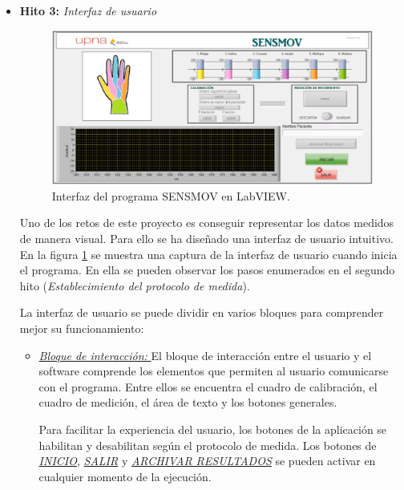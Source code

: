 \begin{itemize} [label=]
	 
	
	\item \textbf{Hito 3:} \textit{Interfaz de usuario}
	
	\begin{figure}[H]
		\centering
		\includegraphics[width=1\textwidth]{./img/interfazSMinicio}
		\caption{Interfaz del programa SENSMOV en LabVIEW.}
		\label{fig:interfazinicio}
	\end{figure}
	 
	Uno de los retos de este proyecto es conseguir representar los datos medidos de manera visual. Para ello se ha diseñado una interfaz de usuario intuitivo. En la figura \ref{fig:interfazinicio} se muestra una captura de la interfaz de usuario cuando inicia el programa. En ella se pueden observar los pasos enumerados en el segundo hito (\textit{Establecimiento del protocolo de medida}).
	
	La interfaz de usuario se puede dividir en varios bloques para comprender mejor su funcionamiento:
	
	\begin{itemize} [label=]
		\item \underline{\textit{Bloque de interacción: }} El bloque de interacción entre el usuario y el software comprende los elementos que permiten al usuario comunicarse con el programa. Entre ellos se encuentra el cuadro de calibración, el cuadro de medición, el área de texto y los botones generales. 
		
		Para facilitar la experiencia del usuario, los botones de la aplicación se habilitan y desabilitan según el protocolo de medida. %
		Los botones de \underline{\textit{INICIO}}, \underline{\textit{SALIR}} y \underline{\textit{ARCHIVAR RESULTADOS}} se pueden activar en cualquier momento de la ejecución.
		

\end{itemize}
\end{itemize}
